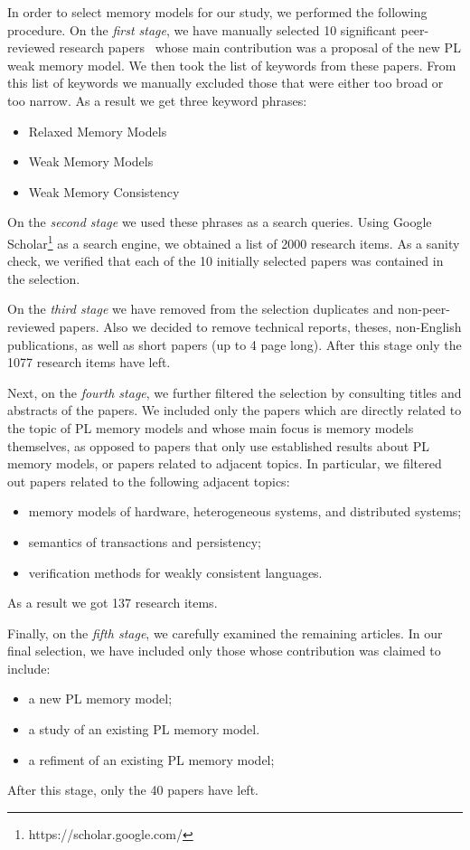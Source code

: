In order to select memory models for our study, we performed the following procedure.
On the \emph{first stage}, we have manually selected 10 significant 
peer-reviewed research papers~\cite{
Manson-al:POPL05,
Batty-al:POPL11,
Lahav-al:PLDI17,
Dolan-al:PLDI18,
Watt-al:PLDI2020,
Jeffrey-Riely:LICS16,
PichonPharabod-Sewell:POPL16,
Kang-al:POPL17,
Chakraborty-Vafeiadis:POPL19,
Paviotti-al:ESOP20
} 
whose main contribution was a proposal of the new PL weak memory model.
We then took the list of keywords from these papers. 
From this list of keywords we manually excluded those 
that were either too broad or too narrow.
As a result we get three keyword phrases:
\begin{itemize}
  \item Relaxed Memory Models
  \item Weak Memory Models
  \item Weak Memory Consistency
\end{itemize}
 
On the \emph{second stage} we used these phrases as a search queries. 
Using Google Scholar\footnote{https://scholar.google.com/} as a search engine, 
we obtained a list of 2000 research items. 
As a sanity check, we verified that each of the 10 initially selected papers 
was contained in the selection. 

On the \emph{third stage} we have removed from the selection duplicates and non-peer-reviewed papers. 
Also we decided to remove technical reports, theses, 
non-English publications, as well as short papers (up to 4 page long).
After this stage only the 1077 research items have left.

Next, on the \emph{fourth stage}, we further filtered the selection 
by consulting titles and abstracts of the papers. 
We included only the papers which are directly related to the 
topic of PL memory models and whose main focus is memory models themselves,
as opposed to papers that only use established results about PL memory models,
or papers related to adjacent topics. 
In particular, we filtered out papers related to the following adjacent topics:
\begin{itemize}
  \item memory models of hardware, heterogeneous systems, and distributed systems;
  \item semantics of transactions and persistency;
  \item verification methods for weakly consistent languages.
\end{itemize}
As a result we got 137 research items.

Finally, on the \emph{fifth stage}, we carefully examined the remaining articles.
In our final selection, we have included only those whose contribution was claimed to include:
\begin{itemize}
  \item a new PL memory model;
  \item a study of an existing PL memory model.
  \item a refiment of an existing PL memory model;
\end{itemize}
After this stage, only the 40 papers have left.

